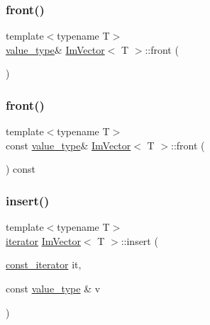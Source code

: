 \hypertarget{class_im_vector_a5b0108d6b1a4a11609723f8305fb9011}{}\label{class_im_vector_a5b0108d6b1a4a11609723f8305fb9011} 
\subsubsection{\texorpdfstring{front()}{front()}\hspace{0.1cm}{\footnotesize\ttfamily [1/2]}}
{\footnotesize\ttfamily template$<$typename T$>$ \\
\hyperlink{class_im_vector_a8bd77e4e7581d8e5f9e98d7c2f3c2a80}{value\+\_\+type}\& \hyperlink{class_im_vector}{Im\+Vector}$<$ T $>$\+::front (\begin{DoxyParamCaption}{ }\end{DoxyParamCaption})}

\hypertarget{class_im_vector_a76dc6bb045574ba79b15a1941b662597}{}\label{class_im_vector_a76dc6bb045574ba79b15a1941b662597} 
\subsubsection{\texorpdfstring{front()}{front()}\hspace{0.1cm}{\footnotesize\ttfamily [2/2]}}
{\footnotesize\ttfamily template$<$typename T$>$ \\
const \hyperlink{class_im_vector_a8bd77e4e7581d8e5f9e98d7c2f3c2a80}{value\+\_\+type}\& \hyperlink{class_im_vector}{Im\+Vector}$<$ T $>$\+::front (\begin{DoxyParamCaption}{ }\end{DoxyParamCaption}) const}

\hypertarget{class_im_vector_a52fdb731c13c82a1fd971186c6a701b5}{}\label{class_im_vector_a52fdb731c13c82a1fd971186c6a701b5} 
\subsubsection{\texorpdfstring{insert()}{insert()}}
{\footnotesize\ttfamily template$<$typename T$>$ \\
\hyperlink{class_im_vector_a74b5478f1f6fd471cc71219bce483db6}{iterator} \hyperlink{class_im_vector}{Im\+Vector}$<$ T $>$\+::insert (\begin{DoxyParamCaption}\item[{\hyperlink{class_im_vector_aedeac9c5080f9d6ce96ae837768ee4c4}{const\+\_\+iterator}}]{it,  }\item[{const \hyperlink{class_im_vector_a8bd77e4e7581d8e5f9e98d7c2f3c2a80}{value\+\_\+type} \&}]{v }\end{DoxyParamCaption})}

